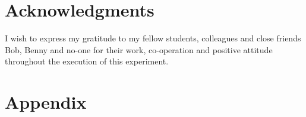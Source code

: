 \documentclass[fleqn,10pt]{SelfArx} %
\newlength{\tocsep}
\begin{document}
\section*{Acknowledgments} %
\label{sec:acknowledgments}
I wish to express my gratitude to my fellow students, colleagues and close friends Bob, Benny and no-one for their work, co-operation and positive attitude throughout the execution of this experiment.

\section*{Appendix}
\label{sec:appendix}



\end{document}
